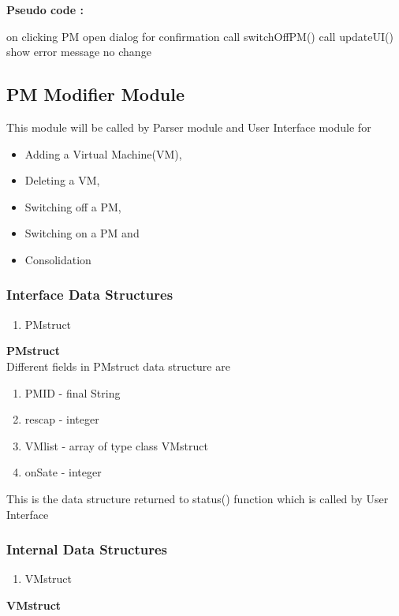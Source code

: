 \documentclass[a4paper,11pt]{article}
\begin{document}
  \textbf{Pseudo code :}
  \begin{algorithmic}[1]
   \STATE on clicking PM 
   \STATE open dialog for confirmation
   \STATE call switchOffPM()
   \STATE call updateUI()
   \ELSE 
   \STATE show error message
   \ENDIF
   \ELSE
   \STATE no change
   \ENDIF
   \ENDIF
  \end{algorithmic}
\pagebreak
\subsection{PM Modifier Module}
This module will be called by Parser module and User Interface module for
\begin{itemize}
 \item Adding a Virtual Machine(VM),
 \item Deleting a VM,
 \item Switching off a PM,
 \item Switching on a PM and
 \item Consolidation
\end{itemize}
\subsubsection{Interface Data Structures}
\begin{enumerate}
 \item PMstruct
 \end{enumerate}
\textbf{PMstruct}
\\

Different fields in PMstruct data structure are
\begin{enumerate}
 \item PM\textunderscore ID - final String
 \item res\textunderscore cap - integer
 \item VM\textunderscore list - array of type class VMstruct
 \item onSate - integer
\end{enumerate}

This is the data structure returned to status() function which is called by User Interface
\\
\subsubsection{Internal Data Structures}
\begin{enumerate}
 \item VMstruct
\end{enumerate}
\textbf{VMstruct}
\\
\end{document}

